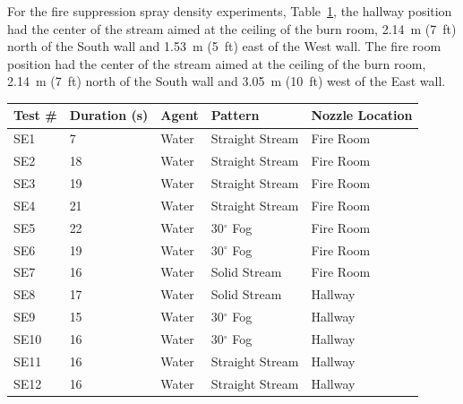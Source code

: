 \documentclass[12pt,oneside]{book}
\begin{document}
For the fire suppression spray density experiments, Table~\ref{tab:spray_density_tests2}, the hallway position had the center of the stream aimed at the ceiling of the burn room, 2.14~m (7~ft) north of the South wall and 1.53~m (5~ft) east of the West wall. The fire room position had the center of the stream aimed at the ceiling of the burn room, 2.14~m (7~ft) north of the South wall and 3.05~m (10~ft) west of the East wall.

\begin{table}[!ht]
\footnotesize
\centering
{}\label{tab:spray_density_tests2}
\begin{tabular}{lllll}
\toprule[1.5pt]
Test \#    & Duration (s)  & Agent  &  Pattern            & Nozzle Location  \\
\midrule
SE1        & 7             & Water  &  Straight Stream    &    Fire Room          \\
SE2        & 18            & Water  &  Straight Stream    &    Fire Room          \\
SE3        & 19            & Water  &  Straight Stream    &    Fire Room          \\
SE4        & 21            & Water  &  Straight Stream    &    Fire Room          \\
SE5        & 22            & Water  &  30$^{\circ}$ Fog   &    Fire Room          \\
SE6        & 19            & Water  &  30$^{\circ}$ Fog   &    Fire Room          \\
SE7        & 16            & Water  &  Solid Stream       &    Fire Room          \\
SE8        & 17            & Water  &  Solid Stream       &    Hallway            \\
SE9        & 15            & Water  &  30$^{\circ}$ Fog   &    Hallway            \\
SE10       & 16            & Water  &  30$^{\circ}$ Fog   &    Hallway            \\
SE11       & 16            & Water  &  Straight Stream    &    Hallway            \\
SE12       & 16            & Water  &  Straight Stream    &    Hallway            \\
\bottomrule[1.25pt]
\end{tabular}\par
\end{table}

\clearpage
\end{document}
